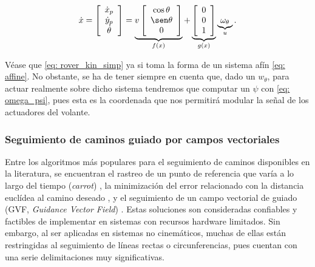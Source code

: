 \begin{equation} \label{eq: rover_kin_simp}
    \dot x =
    \left [
      \begin{array}{c}
         \dot x_p \\
         \dot y_p \\
         \dot \theta
      \end{array}
    \right ] = 
    \underbrace{ v
    \left [
      \begin{array}{cc}
         \cos \theta\\
         \sen \theta\\
         0
      \end{array}
    \right ]
    }_{f(x)}
    +
    \underbrace{
    \left [
      \begin{array}{cc}
         0\\
         0\\
         1
      \end{array}
    \right ]
    }_{g(x)}
    \underbrace{
    \omega_{\theta}
    }_{u}.
\end{equation}

Véase que \eqref{eq: rover_kin_simp} ya si toma la forma de un sistema afín \eqref{eq: affine}. No obstante, se ha de tener siempre en cuenta que, dado un $w_\theta$, para actuar realmente sobre dicho sistema tendremos que computar un $\psi$ con \eqref{eq: omega_psi}, pues esta es la coordenada que nos permitirá modular la señal de los actuadores del volante. 


\subsubsection{Seguimiento de caminos guiado por campos vectoriales}


Entre los algoritmos más populares para el seguimiento de caminos disponibles en la literatura, se encuentran el rastreo de un punto de referencia que varía a lo largo del tiempo (\textit{carrot}) \cite{pathtracking}, la minimización del error relacionado con la distancia euclídea al camino deseado \cite{pathfollow_error}, y el seguimiento de un campo vectorial de guiado (GVF, \textit{Guidance Vector Field}) \cite{pathfollow_vectorfield, gvf_brasil, gvf_classic, gvf_parametric}. Estas soluciones son consideradas confiables y factibles de implementar en sistemas con recursos hardware limitados. Sin embargo, al ser aplicadas en sistemas no cinemáticos, muchas de ellas están restringidas al seguimiento de líneas rectas o circunferencias, pues cuentan con una serie delimitaciones muy significativas.

